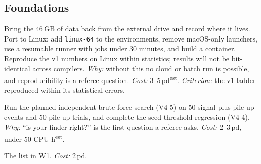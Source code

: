 \documentclass[11pt,a4paper]{article}
\newcommand{\EST}{\textsuperscript{\textsf{est}}}
\newcommand{\must}{\textsf{\textbf{Must}}}
\begin{document}
\subsection{Foundations}
\begin{description}[leftmargin=0pt,style=unboxed]
\item[C1 \must{} Restore and port.] Bring the 46\,GB of data back from the external drive and record where it lives.
  Port to Linux: add \texttt{linux-64} to the environments, remove macOS-only launchers, use a resumable runner with jobs
  under 30 minutes, and build a container. Reproduce the v1 numbers on Linux within statistics; results will not be
  bit-identical across compilers. \emph{Why:} without this no cloud or batch run is possible, and reproducibility is a
  referee question. \emph{Cost:} 3--5\,pd\EST. \emph{Criterion:} the v1 ladder reproduced within its statistical errors.
\item[C2 \must{} Finder cross-checks.] Run the planned independent brute-force search (V4-5) on 50 signal-plus-pile-up
  events and 50 pile-up trials, and complete the seed-threshold regression (V4-4). \emph{Why:} ``is your finder right?''
  is the first question a referee asks. \emph{Cost:} 2--3\,pd, under 50 CPU-h\EST.
\item[C3 \must{} Paper corrections.] The list in W1. \emph{Cost:} 2\,pd.
\end{description}
\end{document}
